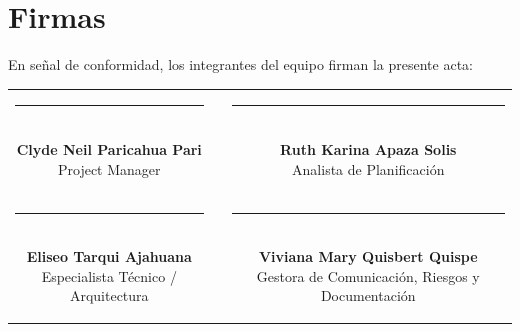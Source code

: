 \documentclass[11pt,a4paper]{article}
\begin{document}
\section{Firmas}
\noindent En señal de conformidad, los integrantes del equipo firman la presente acta:

\vspace{1.5cm}

\begin{center}
\begin{tabular}{c c c}
    \parbox{6.5cm}{\centering \rule{6.0cm}{0.6pt}\\[5pt] \textbf{Clyde Neil Paricahua Pari}\\[2pt] {\footnotesize Project Manager}}
    & \hspace{0.8cm} &
    \parbox{6.5cm}{\centering \rule{6.0cm}{0.6pt}\\[5pt] \textbf{Ruth Karina Apaza Solis}\\[2pt] {\footnotesize Analista de Planificación}}
    \\[2.0cm]
    \parbox{6.5cm}{\centering \rule{6.0cm}{0.6pt}\\[5pt] \textbf{Eliseo Tarqui Ajahuana}\\[2pt] {\footnotesize Especialista Técnico / Arquitectura}}
    & \hspace{0.8cm} &
    \parbox{6.5cm}{\centering \rule{6.0cm}{0.6pt}\\[5pt] \textbf{Viviana Mary Quisbert Quispe}\\[2pt] {\footnotesize Gestora de Comunicación, Riesgos y Documentación}}
\end{tabular}
\end{center}
\end{document}
